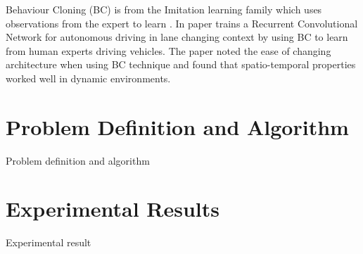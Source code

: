 \documentclass{svproc}
\begin{document}
Behaviour Cloning (BC) is from the Imitation learning family which uses observations from the expert to learn \cite{torabi2018behavioral}. In paper \cite{saksena2019towards} trains a Recurrent Convolutional Network for autonomous driving in lane changing context by using BC to learn from human experts driving vehicles. The paper noted the ease of changing architecture when using BC technique and found that spatio-temporal properties worked well in dynamic environments.


\section{Problem Definition and Algorithm}
Problem definition and algorithm


\section{Experimental Results}
Experimental result
\end{document}
